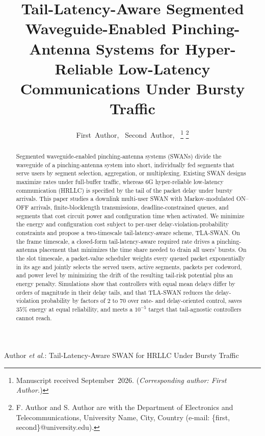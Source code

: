 \documentclass[journal]{IEEEtran}
\begin{document}
\title{Tail-Latency-Aware Segmented Waveguide-Enabled Pinching-Antenna Systems for Hyper-Reliable Low-Latency Communications Under Bursty Traffic}

\author{First~Author,~
        Second~Author,~%
\thanks{Manuscript received September~2026. (\emph{Corresponding author: First Author.})}%
\thanks{F. Author and S. Author are with the Department of Electronics and Telecommunications, University Name, City, Country (e-mail: \{first, second\}@university.edu).}}

%
{Author \MakeLowercase{\textit{et al.}}: Tail-Latency-Aware SWAN for HRLLC Under Bursty Traffic}

\maketitle

\begin{abstract}
Segmented waveguide-enabled pinching-antenna systems (SWANs) divide the waveguide of a pinching-antenna system into short, individually fed segments that serve users by segment selection, aggregation, or multiplexing. Existing SWAN designs maximize rates under full-buffer traffic, whereas 6G hyper-reliable low-latency communication (HRLLC) is specified by the tail of the packet delay under bursty arrivals. This paper studies a downlink multi-user SWAN with Markov-modulated ON--OFF arrivals, finite-blocklength transmissions, deadline-constrained queues, and segments that cost circuit power and configuration time when activated. We minimize the energy and configuration cost subject to per-user delay-violation-probability constraints and propose a two-timescale tail-latency-aware scheme, TLA-SWAN. On the frame timescale, a closed-form tail-latency-aware required rate drives a pinching-antenna placement that minimizes the time share needed to drain all users' bursts. On the slot timescale, a packet-value scheduler weights every queued packet exponentially in its age and jointly selects the served users, active segments, packets per codeword, and power level by minimizing the drift of the resulting tail-risk potential plus an energy penalty. Simulations show that controllers with equal mean delays differ by orders of magnitude in their delay tails, and that TLA-SWAN reduces the delay-violation probability by factors of $2$ to $70$ over rate- and delay-oriented control, saves $35\%$ energy at equal reliability, and meets a $10^{-5}$ target that tail-agnostic controllers cannot reach.
\end{abstract}
\end{document}
